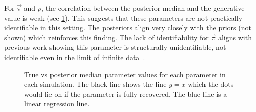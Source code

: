 \documentclass[thesis.tex]{subfiles}
\begin{document}
For $\vec{\pi}$ and $\rho$, the correlation between the posterior median and the generative value is weak (see \cref{SEIR:fig:true-vs-posterior}).
This suggests that these parameters are not practically identifiable in this setting.
The posteriors align very closely with the priors (not shown) which reinforces this finding.
The lack of identifiability for $\vec{\pi}$ aligns with previous work showing this parameter is structurally unidentifiable, \ie not identifiable even in the limit of infinite data~\autocite{dankwaStructural}.
\begin{figure}
    \caption[True vs posterior parameter values]{%
        True vs posterior median parameter values for each parameter in each simulation.
        The black line shows the line $y = x$ which the dots would lie on if the parameter is fully recovered.
        The blue line is a linear regression line.
    }
    \label{SEIR:fig:true-vs-posterior}
\end{figure}
\end{document}
